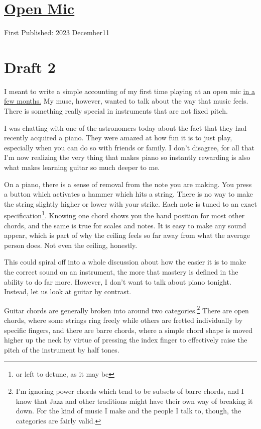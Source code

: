 \documentclass[12pt]{article}[titlepage]
\newcommand{\1}{\={a}}
\newcommand{\2}{\={e}}
\newcommand{\3}{\={\i}}
\newcommand{\4}{\=o}
\newcommand{\5}{\=u}
\newcommand{\6}{\={A}}
\renewcommand{\,}{\textsuperscript{,}}
\begin{document}
\doublespacing
\section{\href{open-mic-9.html}{Open Mic}}
First Published: 2023 December11

\section{Draft 2}
I meant to write a simple accounting of my first time playing at an open mic \href{open-mic-8.html}{in a few months.}
My muse, however, wanted to talk about the way that music feels.
There is something really special in instruments that are not fixed pitch.

I was chatting with one of the astronomers today about the fact that they had recently acquired a piano.
They were amazed at how fun it is to just play, especially when you can do so with friends or family.
I don't disagree, for all that I'm now realizing the very thing that makes piano so instantly rewarding is also what makes learning guitar so much deeper to me.

On a piano, there is a sense of removal from the note you are making.
You press a button which activates a hammer which hits a string.
There is no way to make the string slightly higher or lower with your strike.
Each note is tuned to an exact specification\footnote{or left to detune, as it may be}.
Knowing one chord shows you the hand position for most other chords, and the same is true for scales and notes.
It is easy to make any sound appear, which is part of why the ceiling feels so far away from what the average person does.
Not even the ceiling, honestly.

This could spiral off into a whole discussion about how the easier it is to make the correct sound on an instrument, the more that mastery is defined in the ability to do far more.
However, I don't want to talk about piano tonight.
Instead, let us look at guitar by contrast.

Guitar chords are generally broken into around two categories.\footnote{I'm ignoring power chords which tend to be subsets of barre chords, and I know that Jazz and other traditions might have their own way of breaking it down.
For the kind of music I make and the people I talk to, though, the categories are fairly valid.}
There are open chords, where some strings ring freely while others are fretted individually by specific fingers, and there are barre chords, where a simple chord shape is moved higher up the neck by virtue of pressing the index finger to effectively raise the pitch of the instrument by half tones.
\end{document}
